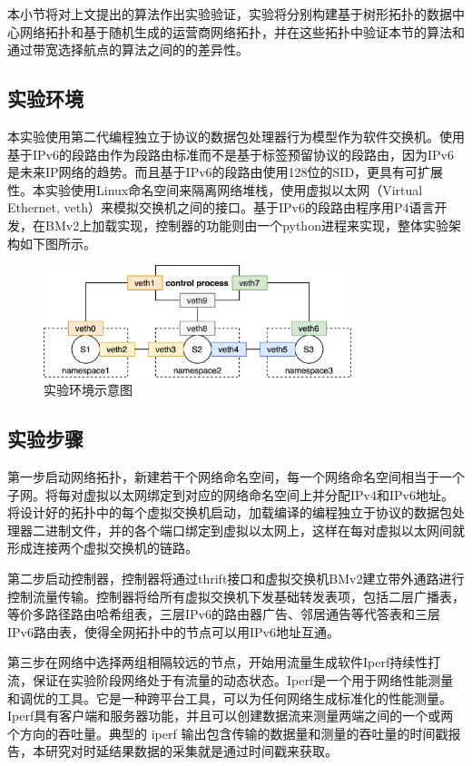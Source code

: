 本小节将对上文提出的算法作出实验验证，实验将分别构建基于树形拓扑的数据中心网络拓扑和基于随机生成的运营商网络拓扑，并在这些拓扑中验证本节的算法和通过带宽选择航点的算法之间的的差异性。

\subsection{实验环境}

本实验使用第二代编程独立于协议的数据包处理器行为模型作为软件交换机。使用基于IPv6的段路由作为段路由标准而不是基于标签预留协议的段路由，因为IPv6是未来IP网络的趋势。而且基于IPv6的段路由使用128位的SID，更具有可扩展性。本实验使用Linux命名空间来隔离网络堆栈，使用虚拟以太网（Virtual Ethernet, veth）来模拟交换机之间的接口。基于IPv6的段路由程序用P4语言开发，在BMv2上加载实现，控制器的功能则由一个python进程来实现，整体实验架构如下图所示。

\begin{figure}[htbp]
\setlength{\abovecaptionskip}{15pt plus 3pt minus 2pt}
\centerline{\includegraphics[width=0.8\textwidth]{./figures/ch3-test-env.png}}
\caption{实验环境示意图}
\label{fig-ch3-test-env}
\end{figure}

\subsection{实验步骤}

第一步启动网络拓扑，新建若干个网络命名空间，每一个网络命名空间相当于一个子网。将每对虚拟以太网绑定到对应的网络命名空间上并分配IPv4和IPv6地址。将设计好的拓扑中的每个虚拟交换机启动，加载编译的编程独立于协议的数据包处理器二进制文件，并的各个端口绑定到虚拟以太网上，这样在每对虚拟以太网间就形成连接两个虚拟交换机的链路。

第二步启动控制器，控制器将通过thrift接口和虚拟交换机BMv2建立带外通路进行控制流量传输。控制器将给所有虚拟交换机下发基础转发表项，包括二层广播表，等价多路径路由哈希组表，三层IPv6的路由器广告、邻居通告等代答表和三层IPv6路由表，使得全网拓扑中的节点可以用IPv6地址互通。

第三步在网络中选择两组相隔较远的节点，开始用流量生成软件Iperf持续性打流，保证在实验阶段网络处于有流量的动态状态。Iperf是一个用于网络性能测量和调优的工具。它是一种跨平台工具，可以为任何网络生成标准化的性能测量。Iperf具有客户端和服务器功能，并且可以创建数据流来测量两端之间的一个或两个方向的吞吐量。典型的 iperf 输出包含传输的数据量和测量的吞吐量的时间戳报告，本研究对时延结果数据的采集就是通过时间戳来获取。

